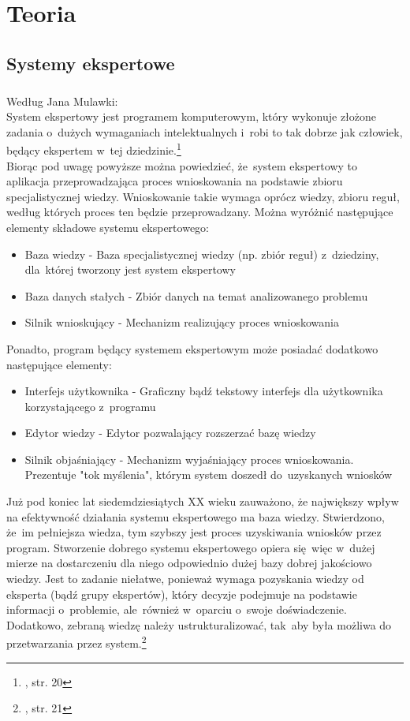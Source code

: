 \chapter{Teoria}\label{chap:teoria}

\section{Systemy ekspertowe}

\paragraph{}
Według Jana Mulawki:\\System ekspertowy jest programem komputerowym, który wykonuje złożone zadania o~dużych wymaganiach intelektualnych i~robi to tak dobrze jak człowiek, będący ekspertem w~tej dziedzinie.\footnote{\cite{mulawka}, str. 20}\\
Biorąc pod uwagę powyższe można powiedzieć, że~system ekspertowy to aplikacja przeprowadzająca proces wnioskowania na podstawie zbioru specjalistycznej wiedzy. Wnioskowanie takie wymaga oprócz wiedzy, zbioru reguł, według których proces ten będzie przeprowadzany. Można wyróżnić następujące elementy składowe systemu ekspertowego:
\begin{itemize}
	\item Baza wiedzy - Baza specjalistycznej wiedzy (np. zbiór reguł) z~dziedziny, dla~której tworzony jest system ekspertowy
	\item Baza danych stałych - Zbiór danych na temat analizowanego problemu
	\item Silnik wnioskujący - Mechanizm realizujący proces wnioskowania
\end{itemize}

Ponadto, program będący systemem ekspertowym może posiadać dodatkowo następujące elementy:
\begin{itemize}
	\item Interfejs użytkownika - Graficzny bądź tekstowy interfejs dla użytkownika korzystającego z~programu
	\item Edytor wiedzy - Edytor pozwalający rozszerzać bazę wiedzy
	\item Silnik objaśniający - Mechanizm wyjaśniający proces wnioskowania. Prezentuje "tok myślenia", którym system doszedł do~uzyskanych wniosków
\end{itemize}

Już pod koniec lat siedemdziesiątych XX wieku zauważono, że największy wpływ na efektywność działania systemu ekspertowego ma baza wiedzy. Stwierdzono, że~im pełniejsza wiedza, tym szybszy jest proces uzyskiwania wniosków przez program. Stworzenie dobrego systemu ekspertowego opiera się~więc w~dużej mierze na dostarczeniu dla niego odpowiednio dużej bazy dobrej jakościowo wiedzy. Jest to zadanie niełatwe, ponieważ wymaga pozyskania wiedzy od eksperta (bądź grupy ekspertów), który decyzje podejmuje na podstawie informacji o~problemie, ale~również w~oparciu o~swoje doświadczenie. Dodatkowo, zebraną wiedzę należy ustrukturalizować, tak~aby była możliwa do przetwarzania przez system.\footnote{\cite{mulawka}, str. 21}

